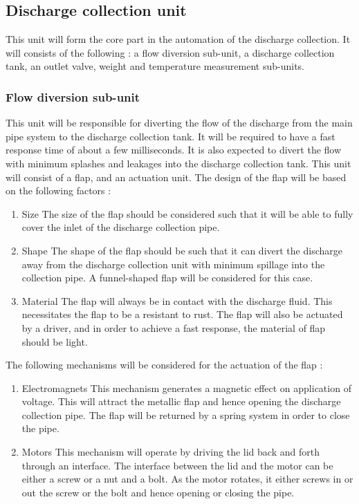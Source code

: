\subsection{Discharge collection unit}
This unit will form the core part in the automation of the discharge collection. It will consists of the following : a flow diversion sub-unit, a discharge collection tank, an outlet valve, weight and temperature measurement sub-units. 
 
\subsubsection{Flow diversion sub-unit}
This unit will be responsible for diverting the flow of the discharge from the main pipe system to the discharge collection tank. It will be required to have a fast response time of about a few milliseconds. It is also expected to divert the flow with minimum splashes and leakages into the discharge collection tank. This unit will consist of a flap, and an actuation unit. The design of the flap will be based on the following factors :
\begin{enumerate}
    \item Size \newline
    The size of the flap should be considered such that it will be able to fully cover the inlet of the discharge collection pipe. 
    \item Shape \newline
    The shape of the flap should be such that it can divert the discharge away from the discharge collection unit with minimum spillage into the collection pipe. A funnel-shaped flap will be considered for this case.
    \item Material \newline
    The flap will always be in contact with the discharge fluid. This necessitates the flap to be a resistant to rust. The flap will also be actuated by a driver, and in order to achieve a fast response, the material of flap should be light.
\end{enumerate}
\par
The following mechanisms will be considered for the actuation of the flap :
\begin{enumerate}
    \item Electromagnets \newline
    This mechanism generates a magnetic effect on application of voltage. This will attract the metallic flap and hence opening the discharge collection pipe. The flap will be returned by a spring system in order to close the pipe.
    \item Motors \newline
    This mechanism will operate by driving the lid back and forth through an interface. The interface between the lid and the motor can be either a screw or a nut and a bolt. As the motor rotates, it either screws in or out the screw or the bolt and hence opening or closing the pipe.
\end{enumerate}

